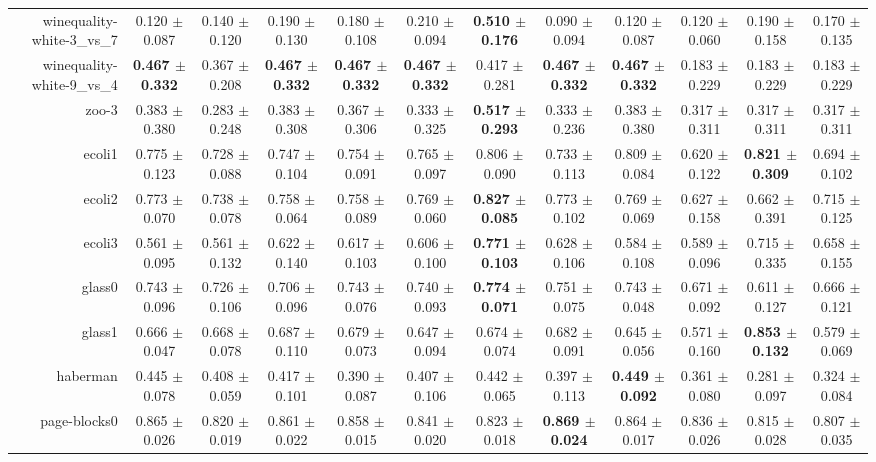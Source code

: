 \begin{table}[!ht]
{\begin{tabular}{r c c c c c c c c c c c}
winequality-white-3\_vs\_7 & 0.120 $\pm$ 0.087 & 0.140 $\pm$ 0.120 & 0.190 $\pm$ 0.130 & 0.180 $\pm$ 0.108 & 0.210 $\pm$ 0.094 & \textbf{0.510 $\pm$ 0.176} & 0.090 $\pm$ 0.094 & 0.120 $\pm$ 0.087 & 0.120 $\pm$ 0.060 & 0.190 $\pm$ 0.158 & 0.170 $\pm$ 0.135 \\
winequality-white-9\_vs\_4 & \textbf{0.467 $\pm$ 0.332} & 0.367 $\pm$ 0.208 & \textbf{0.467 $\pm$ 0.332} & \textbf{0.467 $\pm$ 0.332} & \textbf{0.467 $\pm$ 0.332} & 0.417 $\pm$ 0.281 & \textbf{0.467 $\pm$ 0.332} & \textbf{0.467 $\pm$ 0.332} & 0.183 $\pm$ 0.229 & 0.183 $\pm$ 0.229 & 0.183 $\pm$ 0.229 \\
zoo-3 & 0.383 $\pm$ 0.380 & 0.283 $\pm$ 0.248 & 0.383 $\pm$ 0.308 & 0.367 $\pm$ 0.306 & 0.333 $\pm$ 0.325 & \textbf{0.517 $\pm$ 0.293} & 0.333 $\pm$ 0.236 & 0.383 $\pm$ 0.380 & 0.317 $\pm$ 0.311 & 0.317 $\pm$ 0.311 & 0.317 $\pm$ 0.311 \\
ecoli1 & 0.775 $\pm$ 0.123 & 0.728 $\pm$ 0.088 & 0.747 $\pm$ 0.104 & 0.754 $\pm$ 0.091 & 0.765 $\pm$ 0.097 & 0.806 $\pm$ 0.090 & 0.733 $\pm$ 0.113 & 0.809 $\pm$ 0.084 & 0.620 $\pm$ 0.122 & \textbf{0.821 $\pm$ 0.309} & 0.694 $\pm$ 0.102 \\
ecoli2 & 0.773 $\pm$ 0.070 & 0.738 $\pm$ 0.078 & 0.758 $\pm$ 0.064 & 0.758 $\pm$ 0.089 & 0.769 $\pm$ 0.060 & \textbf{0.827 $\pm$ 0.085} & 0.773 $\pm$ 0.102 & 0.769 $\pm$ 0.069 & 0.627 $\pm$ 0.158 & 0.662 $\pm$ 0.391 & 0.715 $\pm$ 0.125 \\
ecoli3 & 0.561 $\pm$ 0.095 & 0.561 $\pm$ 0.132 & 0.622 $\pm$ 0.140 & 0.617 $\pm$ 0.103 & 0.606 $\pm$ 0.100 & \textbf{0.771 $\pm$ 0.103} & 0.628 $\pm$ 0.106 & 0.584 $\pm$ 0.108 & 0.589 $\pm$ 0.096 & 0.715 $\pm$ 0.335 & 0.658 $\pm$ 0.155 \\
glass0 & 0.743 $\pm$ 0.096 & 0.726 $\pm$ 0.106 & 0.706 $\pm$ 0.096 & 0.743 $\pm$ 0.076 & 0.740 $\pm$ 0.093 & \textbf{0.774 $\pm$ 0.071} & 0.751 $\pm$ 0.075 & 0.743 $\pm$ 0.048 & 0.671 $\pm$ 0.092 & 0.611 $\pm$ 0.127 & 0.666 $\pm$ 0.121 \\
glass1 & 0.666 $\pm$ 0.047 & 0.668 $\pm$ 0.078 & 0.687 $\pm$ 0.110 & 0.679 $\pm$ 0.073 & 0.647 $\pm$ 0.094 & 0.674 $\pm$ 0.074 & 0.682 $\pm$ 0.091 & 0.645 $\pm$ 0.056 & 0.571 $\pm$ 0.160 & \textbf{0.853 $\pm$ 0.132} & 0.579 $\pm$ 0.069 \\
haberman & 0.445 $\pm$ 0.078 & 0.408 $\pm$ 0.059 & 0.417 $\pm$ 0.101 & 0.390 $\pm$ 0.087 & 0.407 $\pm$ 0.106 & 0.442 $\pm$ 0.065 & 0.397 $\pm$ 0.113 & \textbf{0.449 $\pm$ 0.092} & 0.361 $\pm$ 0.080 & 0.281 $\pm$ 0.097 & 0.324 $\pm$ 0.084 \\
page-blocks0 & 0.865 $\pm$ 0.026 & 0.820 $\pm$ 0.019 & 0.861 $\pm$ 0.022 & 0.858 $\pm$ 0.015 & 0.841 $\pm$ 0.020 & 0.823 $\pm$ 0.018 & \textbf{0.869 $\pm$ 0.024} & 0.864 $\pm$ 0.017 & 0.836 $\pm$ 0.026 & 0.815 $\pm$ 0.028 & 0.807 $\pm$ 0.035 \\

\end{tabular}}
\end{table}
